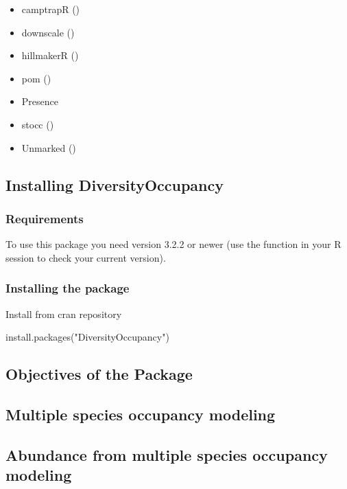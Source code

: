 \documentclass[article]{jss}
\providecommand{\tightlist}{%
  \setlength{\itemsep}{0pt}\setlength{\parskip}{0pt}}
\begin{document}
\begin{itemize}
\tightlist
\item
  camptrapR ()
\item
  downscale ()
\item
  hillmakerR ()
\item
  pom ()
\item
  Presence
\item
  stocc ()
\item
  Unmarked ()
\end{itemize}

\subsection{Installing
DiversityOccupancy}\label{installing-diversityoccupancy}

\subsubsection{Requirements}\label{requirements}

To use this package you need  version 3.2.2 or newer (use
the function  in your R session to check your
current version).

\subsubsection{Installing the package}\label{installing-the-package}

Install from cran repository

\begin{CodeChunk}
\begin{CodeInput}
install.packages("DiversityOccupancy")
\end{CodeInput}
\end{CodeChunk}

\subsection{Objectives of the Package}\label{objectives-of-the-package}

\subsection{Multiple species occupancy
modeling}\label{multiple-species-occupancy-modeling}

\subsection{Abundance from multiple species occupancy
modeling}\label{abundance-from-multiple-species-occupancy-modeling}
\end{document}
